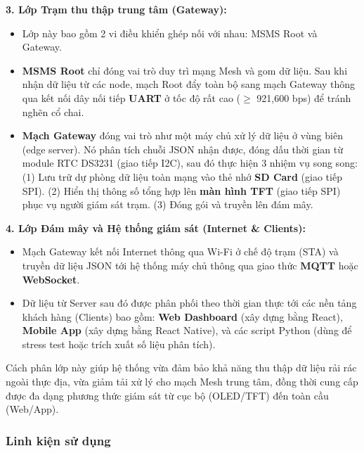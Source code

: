 \documentclass{article} %
\begin{document}
\textbf{3. Lớp Trạm thu thập trung tâm (Gateway):}
\begin{itemize}
    \item Lớp này bao gồm 2 vi điều khiển ghép nối với nhau: MSMS Root và Gateway.
    \item \textbf{MSMS Root} chỉ đóng vai trò duy trì mạng Mesh và gom dữ liệu. Sau khi nhận dữ liệu từ các node, mạch Root đẩy toàn bộ sang mạch Gateway thông qua kết nối dây nối tiếp \textbf{UART} ở tốc độ rất cao ($\ge$ 921,600 bps) để tránh nghẽn cổ chai.
    \item \textbf{Mạch Gateway} đóng vai trò như một máy chủ xử lý dữ liệu ở vùng biên (edge server). Nó phân tích chuỗi JSON nhận được, đóng dấu thời gian từ module RTC DS3231 (giao tiếp I2C), sau đó thực hiện 3 nhiệm vụ song song: 
    (1) Lưu trữ dự phòng dữ liệu toàn mạng vào thẻ nhớ \textbf{SD Card} (giao tiếp SPI). 
    (2) Hiển thị thông số tổng hợp lên \textbf{màn hình TFT} (giao tiếp SPI) phục vụ người giám sát trạm.
    (3) Đóng gói và truyền lên đám mây.
\end{itemize}

\textbf{4. Lớp Đám mây và Hệ thống giám sát (Internet \& Clients):}
\begin{itemize}
    \item Mạch Gateway kết nối Internet thông qua Wi-Fi ở chế độ trạm (STA) và truyền dữ liệu JSON tới hệ thống máy chủ thông qua giao thức \textbf{MQTT} hoặc \textbf{WebSocket}.
    \item Dữ liệu từ Server sau đó được phân phối theo thời gian thực tới các nền tảng khách hàng (Clients) bao gồm: \textbf{Web Dashboard} (xây dựng bằng React), \textbf{Mobile App} (xây dựng bằng React Native), và các script Python (dùng để stress test hoặc trích xuất số liệu phân tích).
\end{itemize}

Cách phân lớp này giúp hệ thống vừa đảm bảo khả năng thu thập dữ liệu rải rác ngoài thực địa, vừa giảm tải xử lý cho mạch Mesh trung tâm, đồng thời cung cấp được đa dạng phương thức giám sát từ cục bộ (OLED/TFT) đến toàn cầu (Web/App).
\subsubsection{Linh kiện sử dụng}
\end{document}
